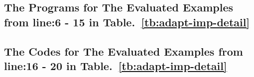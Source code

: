 \subsection{The Programs for The Evaluated Examples from line:6 - 15 in Table.~\ref{tb:adapt-imp-detail}}
\label{apdx:evaluated_examples}

\subsection{The Codes for The Evaluated  Examples from line:16 - 20 in Table.~\ref{tb:adapt-imp-detail}}
\label{apdx:evaluated_codes}


% 